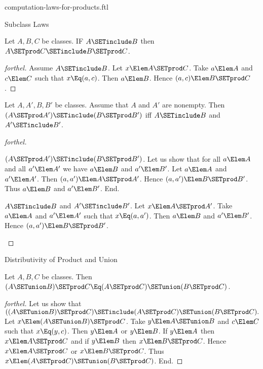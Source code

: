 \documentclass{stex}
\begin{document}
\begin{smodule}{computation-laws-for-products.ftl}

\begin{sfragment}{Subclass Laws}
  \begin{proposition}[forthel]
    Let $A, B, C$ be classes.
    IF $A \SETinclude B$ then $A \SETprod C \SETinclude B \SETprod C$.
  \end{proposition}
  \begin{proof}[forthel]
    Assume $A \SETinclude B$.
    Let $x \Elem A \SETprod C$.
    Take $a \Elem A$ and $c \Elem C$ such that $x \Eq (a, c)$.
    Then $a \Elem B$.
    Hence $(a, c) \Elem B \SETprod C$.
  \end{proof}

  \begin{proposition}[forthel]
    Let $A, A', B, B'$ be classes.
    Assume that $A$ and $A'$ are nonempty.
    Then $(A \SETprod A') \SETinclude (B \SETprod B')$ iff $A \SETinclude B$ and $A' \SETinclude B'$.
  \end{proposition}
  \begin{proof}[forthel]
    \begin{case}{$(A \SETprod A') \SETinclude (B \SETprod B')$.}
      Let us show that for all $a \Elem A$ and all $a' \Elem A'$ we have $a \Elem B$ and $a' \Elem B'$.
        Let $a \Elem A$ and $a' \Elem A'$.
        Then $(a, a') \Elem A \SETprod A'$.
        Hence $(a, a') \Elem B \SETprod B'$.
        Thus $a \Elem B$ and $a' \Elem B'$.
      End.
    \end{case}

    \begin{case}{$A \SETinclude B$ and $A' \SETinclude B'$.}
      Let $x \Elem A \SETprod A'$.
      Take $a \Elem A$ and $a' \Elem A'$ such that $x \Eq (a, a')$.
      Then $a \Elem B$ and $a' \Elem B'$.
      Hence $(a, a') \Elem B \SETprod B'$.
    \end{case}
  \end{proof}
\end{sfragment}

\begin{sfragment}{Distributivity of Product and Union}
  \begin{proposition}[forthel]
    Let $A, B, C$ be classes.
    Then $(A \SETunion B) \SETprod C \Eq (A \SETprod C) \SETunion (B \SETprod C)$.
  \end{proposition}
  \begin{proof}[forthel]
    Let us show that $((A \SETunion B) \SETprod C) \SETinclude (A \SETprod C) \SETunion (B \SETprod C).$ %
      Let $x \Elem (A \SETunion B) \SETprod C$.
      Take $y \Elem A \SETunion B$ and $c \Elem C$ such that $x \Eq (y, c)$.
      Then $y \Elem A$ or $y \Elem B$.
      If $y \Elem A$ then $x \Elem A \SETprod C$ and if $y \Elem B$ then $x \Elem B \SETprod C$.
      Hence $x \Elem A \SETprod C$ or $x \Elem B \SETprod C$.
      Thus $x \Elem (A \SETprod C) \SETunion (B \SETprod C)$.
    End.


\end{proof}
\end{sfragment}
\end{smodule}
\end{document}
